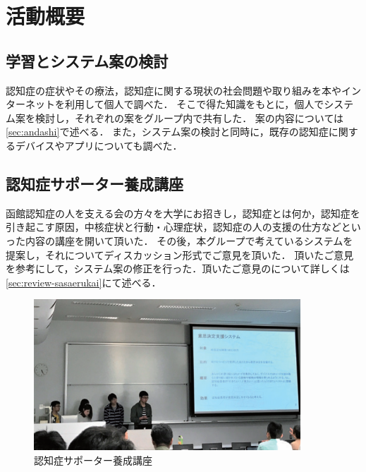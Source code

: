 \documentclass[../report]{subfiles}
\begin{document}
\section{活動概要}
\subsection{学習とシステム案の検討}\label{sec:kentou}
認知症の症状やその療法，認知症に関する現状の社会問題や取り組みを本やインターネットを利用して個人で調べた．
そこで得た知識をもとに，個人でシステム案を検討し，それぞれの案をグループ内で共有した．
案の内容については\ref{sec:andashi}で述べる．
また，システム案の検討と同時に，既存の認知症に関するデバイスやアプリについても調べた．

\subsection{認知症サポーター養成講座}
函館認知症の人を支える会の方々を大学にお招きし，認知症とは何か，認知症を引き起こす原因，中核症状と行動・心理症状，認知症の人の支援の仕方などといった内容の講座を開いて頂いた．
その後，本グループで考えているシステムを提案し，それについてディスカッション形式でご意見を頂いた．
頂いたご意見を参考にして，システム案の修正を行った．頂いたご意見のについて詳しくは\ref{sec:review-sasaerukai}にて述べる．
\begin{figure}[htbp]
    \begin{center}
        \includegraphics[width=10cm]{imgs/ninchisyo-kouza.png}
        \caption{認知症サポーター養成講座}
        \label{fig:ninchisyo-kouza}
    \end{center}
\end{figure}
\end{document}
